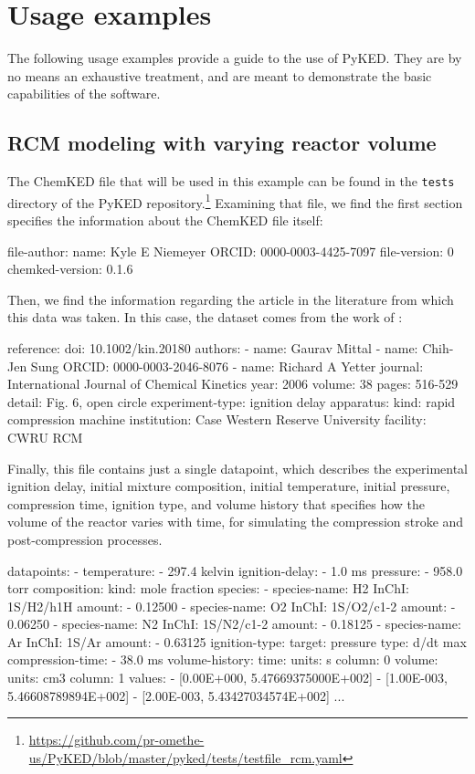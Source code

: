 \documentclass[12pt]{ijck}
\newcommand\ck{ChemKED}
\newcommand\pk{PyKED}
\begin{document}
\section{Usage examples}\label{sec:usage-example}

The following usage examples provide a guide to the use of \pk{}. They are by no
means an exhaustive treatment, and are meant to demonstrate the basic
capabilities of the software.

\subsection{RCM modeling with varying reactor volume}\label{sec:rcm-modeling}

The \ck{} file that will be used in this example can be found in the
\texttt{tests} directory of the PyKED
repository.\footnote{\url{https://github.com/pr-omethe-us/PyKED/blob/master/pyked/tests/testfile_rcm.yaml}}
Examining that file, we find the first section specifies the information about
the \ck{} file itself:
%
\begin{yamlbox}
file-author:
  name: Kyle E Niemeyer
  ORCID: 0000-0003-4425-7097
file-version: 0
chemked-version: 0.1.6
\end{yamlbox}
%
Then, we find the information regarding the article in the literature from which
this data was taken. In this case, the dataset comes from the work of
\textcite{Mittal2006a}:
\begin{yamlbox}
reference:
  doi: 10.1002/kin.20180
  authors:
    - name: Gaurav Mittal
    - name: Chih-Jen Sung
      ORCID: 0000-0003-2046-8076
    - name: Richard A Yetter
  journal: International Journal of Chemical Kinetics
  year: 2006
  volume: 38
  pages: 516-529
  detail: Fig. 6, open circle
experiment-type: ignition delay
apparatus:
  kind: rapid compression machine
  institution: Case Western Reserve University
  facility: CWRU RCM
\end{yamlbox}
%
Finally, this file contains just a single datapoint, which describes the experimental
ignition delay, initial mixture composition, initial temperature, initial pressure,
compression time, ignition type, and volume history that specifies
how the volume of the reactor varies with time, for simulating the compression
stroke and post-compression processes.
%
\begin{yamlbox}
datapoints:
- temperature:
    - 297.4 kelvin
  ignition-delay:
    - 1.0 ms
  pressure:
    - 958.0 torr
  composition:
    kind: mole fraction
    species:
      - species-name: H2
        InChI: 1S/H2/h1H
        amount:
          - 0.12500
      - species-name: O2
        InChI: 1S/O2/c1-2
        amount:
          - 0.06250
      - species-name: N2
        InChI: 1S/N2/c1-2
        amount:
          - 0.18125
      - species-name: Ar
        InChI: 1S/Ar
        amount:
          - 0.63125
  ignition-type:
    target: pressure
    type: d/dt max
  compression-time:
    - 38.0 ms
  volume-history:
    time:
      units: s
      column: 0
    volume:
      units: cm3
      column: 1
    values:
      - [0.00E+000, 5.47669375000E+002]
      - [1.00E-003, 5.46608789894E+002]
      - [2.00E-003, 5.43427034574E+002]
      ...
\end{yamlbox}
\end{document}
